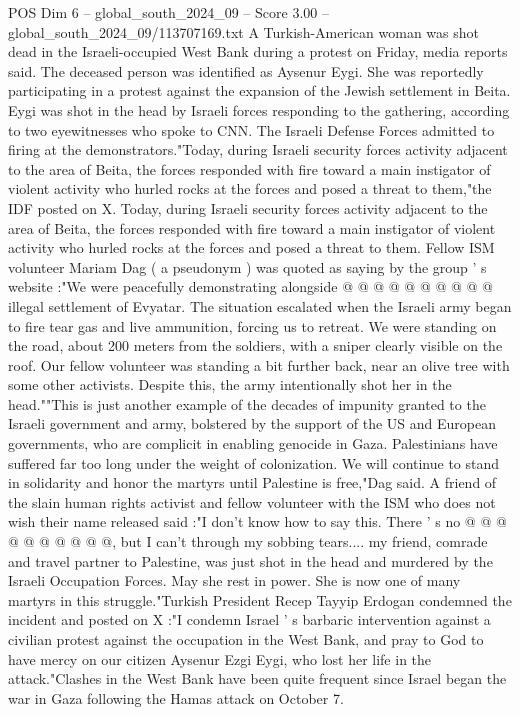 \begin{textsample}{POS Dim 6 – global\_south\_2024\_09 – Score 3.00 – global\_south\_2024\_09/113707169.txt}  \label{ex:f6_pos_440}
A Turkish-American woman was shot dead in the Israeli-occupied West Bank during a protest on Friday, media reports said.
The deceased person was identified as Aysenur Eygi.
She was reportedly participating in a protest against the expansion of the Jewish settlement in Beita.
Eygi was shot in the head by Israeli forces responding to the gathering, according to two eyewitnesses who spoke to CNN.
The Israeli Defense Forces admitted to firing at the demonstrators."Today, during Israeli security forces activity adjacent to the area of Beita, the forces responded with fire toward a main instigator of violent activity who hurled rocks at the forces and posed a threat to them,"the IDF posted on X.
Today, during Israeli security forces activity adjacent to the area of Beita, the forces responded with fire toward a main instigator of violent activity who hurled rocks at the forces and posed a threat to them.
Fellow ISM volunteer Mariam Dag ( a pseudonym ) was quoted as saying by the group ' s website :"We were peacefully demonstrating alongside @ @ @ @ @ @ @ @ @ @ illegal settlement of Evyatar.
The situation escalated when the Israeli army began to fire tear gas and live ammunition, forcing us to retreat.
We were standing on the road, about 200 meters from the soldiers, with a sniper clearly visible on the roof.
Our fellow volunteer was standing a bit further back, near an olive tree with some other activists.
Despite this, the army intentionally shot her in the head.""This is just another example of the decades of impunity granted to the Israeli government and army, bolstered by the support of the US and European governments, who are complicit in enabling genocide in Gaza.
Palestinians have suffered far too long under the weight of colonization.
We will continue to stand in solidarity and honor the martyrs until Palestine is free,"Dag said.
A friend of the slain human rights activist and fellow volunteer with the ISM who does not wish their name released said :"I don't know how to say this.
There ' s no @ @ @ @ @ @ @ @ @ @, but I can't through my sobbing tears.... my friend, comrade and travel partner to Palestine, was just shot in the head and murdered by the Israeli Occupation Forces.
May she rest in power.
She is now one of many martyrs in this struggle."Turkish President Recep Tayyip Erdogan condemned the incident and posted on X :"I condemn Israel ' s barbaric intervention against a civilian protest against the occupation in the West Bank, and pray to God to have mercy on our citizen Aysenur Ezgi Eygi, who lost her life in the attack."Clashes in the West Bank have been quite frequent since Israel began the war in Gaza following the Hamas attack on October 7.

\end{textsample}
